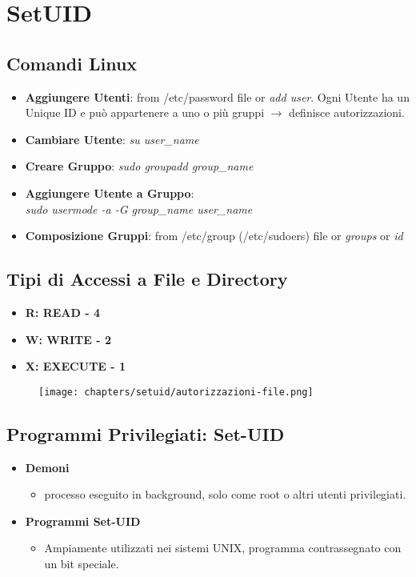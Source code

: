 \chapter{SetUID}

\section{Comandi Linux}

\begin{itemize}
    \item \textbf{Aggiungere Utenti}: from /etc/password file or \textit{add user}. 
    Ogni Utente ha un Unique ID e può appartenere a uno o più gruppi $ \rightarrow $ definisce autorizzazioni.
    \item \textbf{Cambiare Utente}: \textit{su user\_name}
    \item \textbf{Creare Gruppo}: \textit{sudo groupadd group\_name}
    \item \textbf{Aggiungere Utente a Gruppo}: \\\textit{sudo usermode -a -G group\_name user\_name}
    \item \textbf{Composizione Gruppi}: from /etc/group (/etc/sudoers) file or \textit{groups} or \textit{id}
\end{itemize}


\section{Tipi di Accessi a File e Directory}

\begin{itemize}
    \item \textbf{R: READ - 4}
    \item \textbf{W: WRITE - 2}
    \item \textbf{X: EXECUTE - 1}
\end{itemize}

\begin{figure}
    \centering
    \texttt{[image: chapters/setuid/autorizzazioni-file.png]}
\end{figure}


\section{Programmi Privilegiati: Set-UID}

\begin{itemize}
    \item \textbf{Demoni}
    \begin{itemize}
        \item processo eseguito in background, solo come root o altri utenti privilegiati.
    \end{itemize}
    \item \textbf{Programmi Set-UID}
    \begin{itemize}
        \item Ampiamente utilizzati nei sistemi UNIX, programma contrassegnato con un bit speciale.
    \end{itemize}
\end{itemize}


